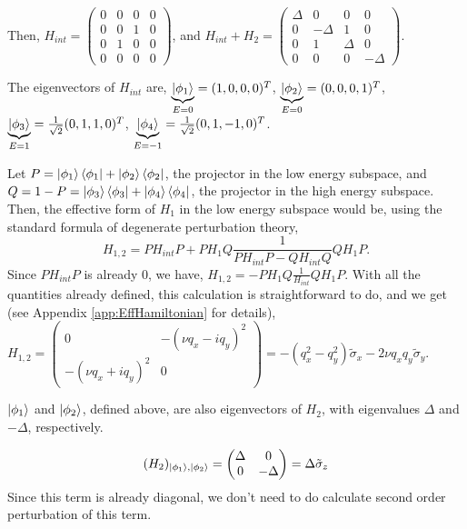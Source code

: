 \documentclass{report}
\begin{document}
Then, $H_{int} = \begin{pmatrix}
	0 & 0 & 0 & 0 \\
	0 & 0 & 1 & 0 \\
	0 & 1 & 0 & 0 \\
	0 & 0 & 0 & 0 
\end{pmatrix}$, and $ H_{int} + H_2 = \begin{pmatrix}
	\Delta & 0 & 0 & 0 \\
	0 & -\Delta & 1 & 0 \\
	0 & 1 & \Delta & 0 \\
	0 & 0 & 0 & -\Delta 
\end{pmatrix} $.

The eigenvectors of $H_{int}$ are, $\underbrace{\ket{\phi_1}}_{E = 0} = (1,0,0,0)^T$, $\underbrace{\ket{\phi_2}}_{E = 0} = (0,0,0,1)^T$,
$\underbrace{\ket{\phi_3}}_{E = 1} = \frac{1}{\sqrt{2}}(0,1,1,0)^T$,
$\underbrace{\ket{\phi_4}}_{E = -1} = \frac{1}{\sqrt{2}}(0,1,-1,0)^T$.

Let $P = \ket{\phi_1}\bra{\phi_1} + \ket{\phi_2}\bra{\phi_2}$, the projector in the low energy subspace, and $Q = 1 - P = \ket{\phi_3}\bra{\phi_3} + \ket{\phi_4}\bra{\phi_4}$, the projector in the high energy subspace.
Then, the effective form of $H_1$ in the low energy subspace would be, using the standard formula of degenerate perturbation theory,
$$H_{1,2} = P H_{int} P + P H_1 Q \frac{1}{P H_{int} P - Q H_{int} Q} Q H_1 P .$$
Since $P H_{int} P$ is already 0, we have, $H_{1,2} =- P H_1 Q \frac{1}{H_{int}} Q H_1 P$. With all the quantities already defined, this calculation is straightforward to do, and we get (see Appendix \ref{app:EffHamiltonian} for details), $H_{1,2} = \begin{pmatrix}
	0 & -(\nu q_x - i q_y)^2\\
	-(\nu q_x + i q_y)^2 & 0
\end{pmatrix} = -(q_x^2 - q_y^2) \tilde{\sigma}_x - 2 \nu q_x q_y \tilde{\sigma}_y$.


$\ket{\phi_1}$ and $\ket{\phi_2}$, defined above, are also eigenvectors of $H_2$, with eigenvalues $\Delta$ and $-\Delta$, respectively.

$$ (H_2)_{\ket{\phi_1}, \ket{\phi_2}} = \begin{pmatrix}
	\Delta & 0 \\
	0 & -\Delta
\end{pmatrix} = \Delta \tilde{\sigma}_z
$$
Since this term is already diagonal, we don't need to do calculate second order perturbation of this term.
\end{document}
